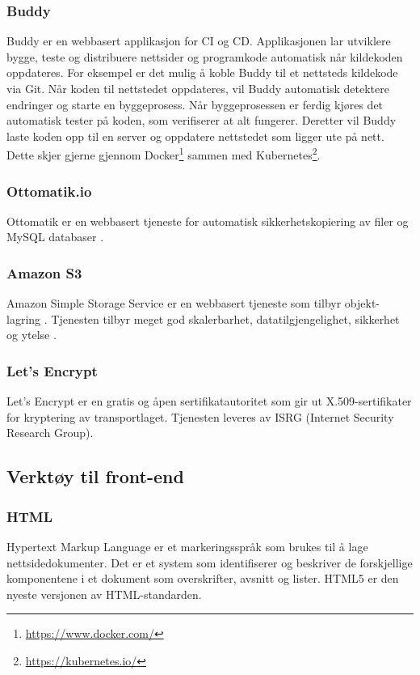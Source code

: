 \subsubsection{Buddy}
Buddy \cite{buddy2019das} er en webbasert applikasjon for CI og CD. Applikasjonen lar utviklere bygge, teste og distribuere nettsider og programkode automatisk når kildekoden oppdateres. For eksempel er det mulig å koble Buddy til et nettsteds kildekode via Git. Når koden til nettstedet oppdateres, vil Buddy automatisk detektere endringer og starte en byggeprosess. Når byggeprosessen er ferdig kjøres det automatisk tester på koden, som verifiserer at alt fungerer. Deretter vil Buddy laste koden opp til en server og oppdatere nettstedet som ligger ute på nett. Dette skjer gjerne gjennom Docker\footnote{\url{https://www.docker.com/}} sammen med Kubernetes\footnote{\url{https://kubernetes.io/}}.

\subsubsection{Ottomatik.io}
Ottomatik er en webbasert tjeneste for automatisk sikkerhetskopiering av filer og MySQL databaser \cite{barnes2016osb}.

\subsubsection{Amazon S3}
Amazon Simple Storage Service er en webbasert tjeneste som tilbyr objekt-lagring \cite{aws2019as3}. Tjenesten tilbyr meget god skalerbarhet, datatilgjengelighet, sikkerhet og ytelse \cite{garfinkel2007aeagcs}.

\subsubsection{Let’s Encrypt}
Let’s Encrypt \cite{le2019ale} er en gratis og åpen sertifikatautoritet som gir ut X.509-sertifikater for kryptering av transportlaget. Tjenesten leveres av ISRG (Internet Security Research Group).

\subsection{Verktøy til front-end}

\subsubsection{HTML}
Hypertext Markup Language \cite{w3c2016hc} er et markeringsspråk som brukes til å lage nettsidedokumenter. Det er et system som identifiserer og beskriver de forskjellige komponentene i et dokument som overskrifter, avsnitt og lister. HTML5 er den nyeste versjonen av HTML-standarden.

